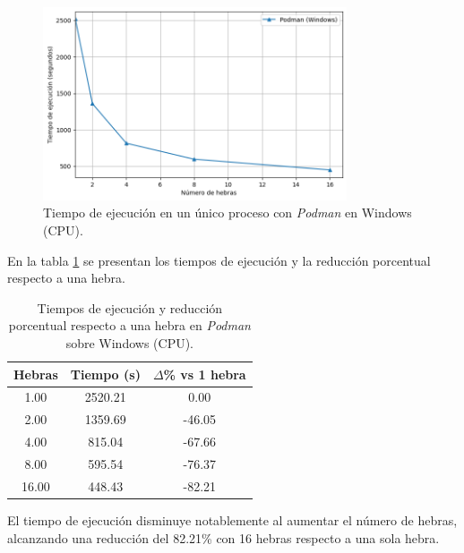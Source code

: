 \begin{figure}[ht]
    \centering
    \includegraphics[width=0.8\textwidth]{imagenes/cap5/single-node_windows_podman_time.png}
    \caption{Tiempo de ejecución en un único proceso con \textit{Podman} en Windows (CPU).}
    \label{fig:single-node_windows_podman_time}
\end{figure}

En la tabla \ref{tab:single-node_windows_podman_time} se presentan los tiempos de ejecución y la reducción porcentual respecto a una hebra.

\begin{table}[ht]
    \centering
    \begin{tabular}{|c|c|c|}
        \hline
        \textbf{Hebras} & \textbf{Tiempo (s)} & \textbf{$\Delta$\% vs 1 hebra} \\
        \hline
        1.00            & 2520.21             & 0.00                           \\
        2.00            & 1359.69             & -46.05                         \\
        4.00            & 815.04              & -67.66                         \\
        8.00            & 595.54              & -76.37                         \\
        16.00           & 448.43              & -82.21                         \\
        \hline
    \end{tabular}
    \caption{Tiempos de ejecución y reducción porcentual respecto a una hebra en \textit{Podman} sobre Windows (CPU).}
    \label{tab:single-node_windows_podman_time}
\end{table}

El tiempo de ejecución disminuye notablemente al aumentar el número de hebras, alcanzando una reducción del 82.21\% con 16 hebras respecto a una sola hebra.

